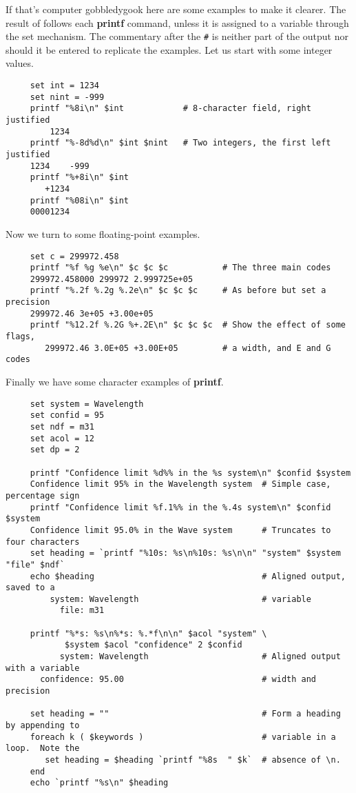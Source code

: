 If that's computer gobbledygook here are some examples to make it
clearer.  The result of follows each {\bf printf} command, unless it
is assigned to a variable through the set mechanism.  The commentary
after the {\tt \#} is neither part of the output nor should it be
entered to replicate the examples.  Let us start with some integer values.
\small
\begin{verbatim}
     set int = 1234
     set nint = -999
     printf "%8i\n" $int            # 8-character field, right justified
         1234
     printf "%-8d%d\n" $int $nint   # Two integers, the first left justified
     1234    -999
     printf "%+8i\n" $int
        +1234
     printf "%08i\n" $int
     00001234
\end{verbatim}
\normalsize
Now we turn to some floating-point examples.
\small
\begin{verbatim}
     set c = 299972.458
     printf "%f %g %e\n" $c $c $c           # The three main codes
     299972.458000 299972 2.999725e+05
     printf "%.2f %.2g %.2e\n" $c $c $c     # As before but set a precision
     299972.46 3e+05 +3.00e+05
     printf "%12.2f %.2G %+.2E\n" $c $c $c  # Show the effect of some flags,
        299972.46 3.0E+05 +3.00E+05         # a width, and E and G codes
\end{verbatim}
\normalsize
Finally we have some character examples of {\bf printf}.
\small
\begin{verbatim}
     set system = Wavelength   
     set confid = 95
     set ndf = m31
     set acol = 12
     set dp = 2
     
     printf "Confidence limit %d%% in the %s system\n" $confid $system
     Confidence limit 95% in the Wavelength system  # Simple case, percentage sign
     printf "Confidence limit %f.1%% in the %.4s system\n" $confid $system
     Confidence limit 95.0% in the Wave system      # Truncates to four characters
     set heading = `printf "%10s: %s\n%10s: %s\n\n" "system" $system "file" $ndf`
     echo $heading                                  # Aligned output, saved to a 
         system: Wavelength                         # variable
           file: m31

     printf "%*s: %s\n%*s: %.*f\n\n" $acol "system" \
            $system $acol "confidence" 2 $confid
           system: Wavelength                       # Aligned output with a variable
       confidence: 95.00                            # width and precision

     set heading = ""                               # Form a heading by appending to
     foreach k ( $keywords )                        # variable in a loop.  Note the 
        set heading = $heading `printf "%8s  " $k`  # absence of \n.
     end
     echo `printf "%s\n" $heading
   \end{verbatim}
\normalsize

